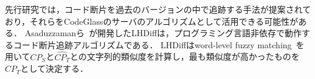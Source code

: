 
先行研究では，コード断片を過去のバージョンの中で追跡する手法が提案されており，それらをCodeGlassのサーバのアルゴリズムとして活用できる可能性がある．
Asaduzzamanら~\cite{LHDiff}が開発したLHDiffは，プログラミング言語非依存で動作するコード断片追跡アルゴリズムである．
LHDiffはword-level fuzzy matching~\cite{sankoff1983time}を用いて$CP_{S}$と$\widehat{CP_T}$との文字列的類似度を計算し，最も類似度が高かったものを$CP_{T}$として決定する．



